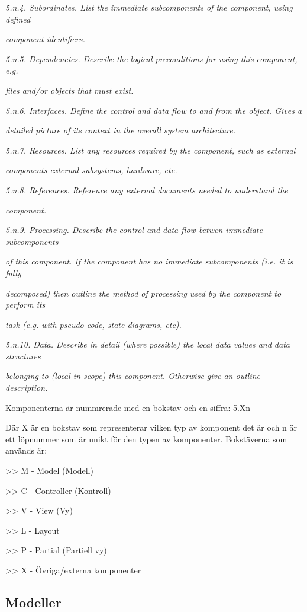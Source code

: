 \documentclass[a4paper, twoside, 11pt, titlepage]{article}
\begin{document}
\emph{5.n.4. Subordinates. List the immediate subcomponents of the component, using defined}

\emph{component identifiers.}

\emph{5.n.5. Dependencies. Describe the logical preconditions for using this component, e.g.}

\emph{files and/or objects that must exist.}

\emph{5.n.6. Interfaces. Define the control and data flow to and from the object. Gives a}

\emph{detailed picture of its context in the overall system architecture.}

\emph{5.n.7. Resources. List any resources required by the component, such as external}

\emph{components external subsystems, hardware, etc.}

\emph{5.n.8. References. Reference any external documents needed to understand the}

\emph{component.}

\emph{5.n.9. Processing. Describe the control and data flow betwen immediate subcomponents}

\emph{of this component. If the component has no immediate subcomponents (i.e. it is fully}

\emph{decomposed) then outline the method of processing used by the component to perform its}

\emph{task (e.g. with pseudo-code, state diagrams, etc).}

\emph{5.n.10. Data. Describe in detail (where possible) the local data values and data structures}

\emph{belonging to (local in scope) this component. Otherwise give an outline description.}

Komponenterna är nummrerade med en bokstav och en siffra: 5.Xn

Där X är en bokstav som representerar vilken typ av komponent det är och n är ett löpnummer som är unikt för den typen av komponenter. Bokstäverna som används är:

>> M - Model (Modell)

>> C - Controller (Kontroll)

>> V - View (Vy)

>> L - Layout

>> P - Partial (Partiell vy)

>> X - Övriga/externa komponenter

	\subsection{Modeller}
\end{document}
